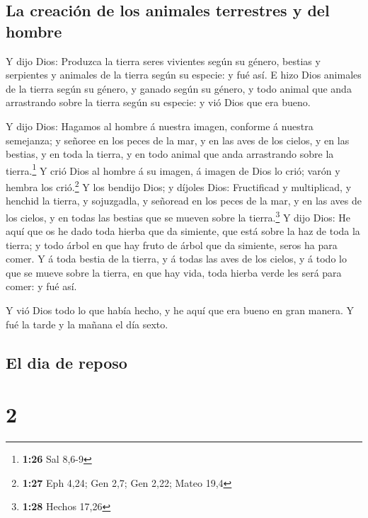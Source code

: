 \hypertarget{la-creaciuxf3n-de-los-animales-terrestres-y-del-hombre}{%
\subsection{La creación de los animales terrestres y del
hombre}\label{la-creaciuxf3n-de-los-animales-terrestres-y-del-hombre}}

 Y dijo Dios: Produzca la tierra seres vivientes según su
género, bestias y serpientes y animales de la tierra según su especie: y
fué así.  E hizo Dios animales de la tierra según su
género, y ganado según su género, y todo animal que anda arrastrando
sobre la tierra según su especie: y vió Dios que era bueno.

 Y dijo Dios: Hagamos al hombre á nuestra imagen, conforme
á nuestra semejanza; y señoree en los peces de la mar, y en las aves de
los cielos, y en las bestias, y en toda la tierra, y en todo animal que
anda arrastrando sobre la tierra.\footnote{\textbf{1:26} Sal 8,6-9}
 Y crió Dios al hombre á su imagen, á imagen de Dios lo
crió; varón y hembra los crió.\footnote{\textbf{1:27} Eph 4,24; Gen 2,7;
  Gen 2,22; Mateo 19,4}  Y los bendijo Dios; y díjoles
Dios: Fructificad y multiplicad, y henchid la tierra, y sojuzgadla, y
señoread en los peces de la mar, y en las aves de los cielos, y en todas
las bestias que se mueven sobre la tierra.\footnote{\textbf{1:28} Hechos
  17,26}  Y dijo Dios: He aquí que os he dado toda hierba
que da simiente, que está sobre la haz de toda la tierra; y todo árbol
en que hay fruto de árbol que da simiente, seros ha para comer.
 Y á toda bestia de la tierra, y á todas las aves de los
cielos, y á todo lo que se mueve sobre la tierra, en que hay vida, toda
hierba verde les será para comer: y fué así.

 Y vió Dios todo lo que había hecho, y he aquí que era
bueno en gran manera. Y fué la tarde y la mañana el día sexto.

\hypertarget{el-dia-de-reposo}{%
\subsection{El dia de reposo}\label{el-dia-de-reposo}}

\hypertarget{section-1}{%
\section{2}\label{section-1}}

